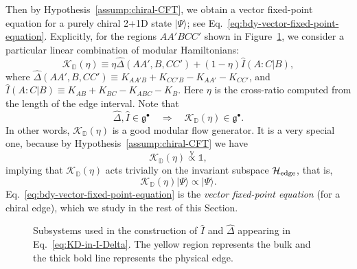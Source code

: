\documentclass[12pt, nofootinbib]{article}
\theoremstyle{plain}
\theoremstyle{assumption}
\theoremstyle{definition}
\theoremstyle{plain}
\theoremstyle{plain}
\theoremstyle{plain}
\theoremstyle{plain}
\theoremstyle{plain}
\newcommand{\calK}{{\mathcal K}}
\def\KD{\calK_{\mathbb{D}}}
\begin{document}
Then by Hypothesis~\ref{assump:chiral-CFT}, we obtain a vector fixed-point equation for a purely chiral 2+1D state $|\Psi\rangle$; see Eq.~\eqref{eq:bdy-vector-fixed-point-equation}. Explicitly, for the regions $AA'B CC'$ shown in Figure~\ref{fig:KD_eta}, we consider
 a particular linear combination of modular Hamiltonians:
\begin{equation}\label{eq:KD-in-I-Delta}
    \KD(\eta) \equiv \eta \hat{\Delta}(AA',B,CC') + (1-\eta) \hat{I}(A:C|B), 
\end{equation} 
where $\hat{\Delta}(AA',B,CC') \equiv K_{AA'B}+K_{CC'B}-K_{AA'}-K_{CC'}$, and $\hat{I}(A:C|B)\equiv K_{AB}+K_{BC}-K_{ABC}-K_B$. Here $\eta$ is the cross-ratio computed from the length of the edge interval.  Note that 
\begin{equation}
    \hat{\Delta}, \hat{I} \in \mathfrak{g}^\bullet \quad \Rightarrow \quad  \KD(\eta) \in   \mathfrak{g}^\bullet. 
\end{equation}
In other words, $\KD(\eta)$ is a good modular flow generator.
It is a very special one, because by Hypothesis~\ref{assump:chiral-CFT} we have 
\begin{equation}
    \KD(\eta)  \overset{\mathbb{V}}{\propto}  \mathbb{1} ,
\end{equation}
implying that $\KD(\eta)$ acts trivially on the invariant subspace $\mathcal{H}_{\rm edge}$, that is,
\begin{equation}
\label{eq:bdy-vector-fixed-point-equation}
\boxed{    \KD (\eta)|\Psi\rangle \propto |\Psi\rangle. }
\end{equation}
Eq.~\eqref{eq:bdy-vector-fixed-point-equation} is the \emph{vector fixed-point equation} (for a chiral edge), which we study in the rest of this Section.

\begin{figure}[h]
    \centering
    \caption{Subsystems used in the construction of $\hat{I}$ and $\hat{\Delta}$ appearing in Eq.~\eqref{eq:KD-in-I-Delta}. The yellow region represents the bulk and the thick bold line represents the physical edge. }
    \label{fig:KD_eta}
\end{figure}
\end{document}
